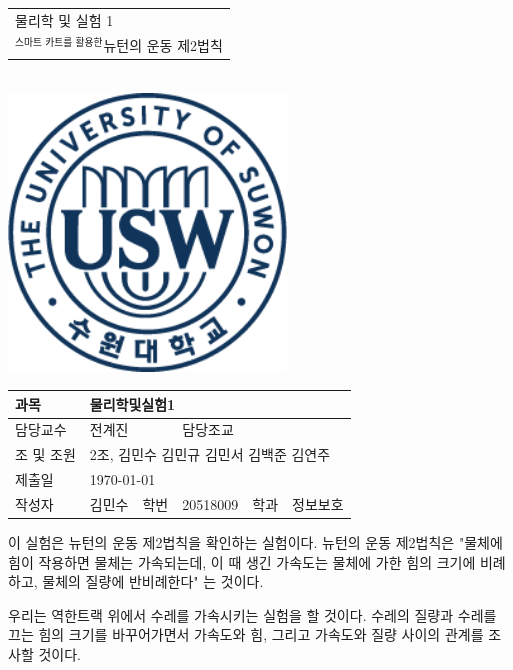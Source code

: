 \documentclass[12pt,a4paper]{article}
\begin{document}
\begin{titlepage}
    \centering
    \begin{tabular}{|C{15cm}|}
        \hline
        \rule{0in}{6ex}
        {\huge 물리학 및 실험 1\par} \\ 
        {\large $^{\textrm{스마트 카트를 활용한}}$뉴턴의 운동 제2법칙\par} \\
        \hline
    \end{tabular} \\
    \vspace{5cm}
    \includegraphics[height=7.36cm]{logo.png}\par
    \vspace{3cm}
    \begin{tabular}{|l|l|l|l|l|l|}
        \hline
        과목 & \multicolumn{5}{l|}{물리학및실험1} \\
        \hline
        담당교수 & \multicolumn{2}{l|}{전계진} & 담당조교 & \multicolumn{2}{l|}{} \\
        \hline
        조 및 조원 & \multicolumn{5}{l|}{2조, 김민수 김민규 김민서 김백준 김연주} \\
        \hline
        제출일 & \multicolumn{5}{l|}{\today} \\
        \hline
        작성자 & 김민수 & 학번 & 20518009 & 학과 & 정보보호 \\
        \hline
    \end{tabular}
\end{titlepage}
이 실험은 뉴턴의 운동 제2법칙을 확인하는 실험이다. 뉴턴의 운동 제2법칙은 "물체에 힘이
작용하면 물체는 가속되는데, 이 때 생긴 가속도는 물체에 가한 힘의 크기에 비례하고,
물체의 질량에 반비례한다" 는 것이다.

우리는 역한트랙 위에서 수레를 가속시키는 실험을 할 것이다. 수레의 질량과 수레를 끄는
힘의 크기를 바꾸어가면서 가속도와 힘, 그리고 가속도와 질량 사이의 관계를 조사할 것이다.
\end{document}
